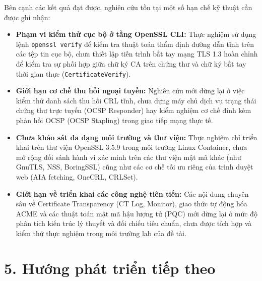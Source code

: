 Bên cạnh các kết quả đạt được, nghiên cứu tồn tại một số hạn chế kỹ thuật cần được ghi nhận:
\begin{itemize}
    \item \textbf{Phạm vi kiểm thử cục bộ ở tầng OpenSSL CLI:} Thực nghiệm sử dụng lệnh \texttt{openssl verify} để kiểm tra thuật toán thẩm định đường dẫn tĩnh trên các tệp tin cục bộ, chưa thiết lập tiến trình bắt tay mạng TLS 1.3 hoàn chỉnh để kiểm tra sự phối hợp giữa chữ ký CA trên chứng thư và chữ ký bắt tay thời gian thực (\texttt{CertificateVerify}).
    \item \textbf{Giới hạn cơ chế thu hồi ngoại tuyến:} Nghiên cứu mới dừng lại ở việc kiểm thử danh sách thu hồi CRL tĩnh, chưa dựng máy chủ dịch vụ trạng thái chứng thư trực tuyến (OCSP Responder) hay kiểm nghiệm cơ chế đính kèm phản hồi OCSP (OCSP Stapling) trong giao tiếp mạng thực tế.
    \item \textbf{Chưa khảo sát đa dạng môi trường và thư viện:} Thực nghiệm chỉ triển khai trên thư viện OpenSSL 3.5.9 trong môi trường Linux Container, chưa mở rộng đối sánh hành vi xác minh trên các thư viện mật mã khác (như GnuTLS, NSS, BoringSSL) cũng như các cơ chế tối ưu riêng của trình duyệt web (AIA fetching, OneCRL, CRLSet).
    \item \textbf{Giới hạn về triển khai các công nghệ tiên tiến:} Các nội dung chuyên sâu về Certificate Transparency (CT Log, Monitor), giao thức tự động hóa ACME và các thuật toán mật mã hậu lượng tử (PQC) mới dừng lại ở mức độ phân tích kiến trúc lý thuyết và đối chiếu tiêu chuẩn, chưa được tích hợp và kiểm thử thực nghiệm trong môi trường lab của đề tài.
\end{itemize}

\section*{5. Hướng phát triển tiếp theo}

